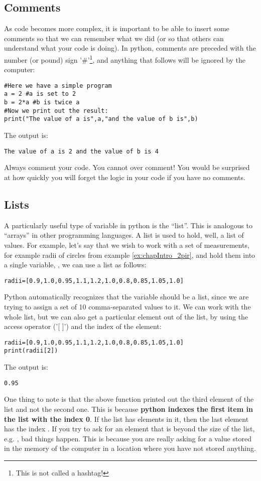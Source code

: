\subsection{Comments}
As code becomes more complex, it is important to be able to insert some comments so that we can remember what we did (or so that others can understand what your code is doing). In python, comments are preceded with the number (or pound) sign '\#'\footnote{This is not called a hashtag!}, and anything that follows will be ignored by the computer:
\begin{lstlisting}[frame=single]
#Here we have a simple program 
a = 2 #a is set to 2
b = 2*a #b is twice a
#Now we print out the result:
print("The value of a is",a,"and the value of b is",b)
\end{lstlisting}
The output is:
\begin{verbatim}
The value of a is 2 and the value of b is 4
\end{verbatim}
Always comment your code. You cannot over comment! You would be surprised at how quickly you will forget the logic in your code if you have no comments.
\subsection{Lists}
A particularly useful type of variable in python is the ``list''. This is analogous to ``arrays'' in other programming languages. A list is used to hold, well, a list of values. For example, let's say that we wish to work with a set of measurements, for example radii of circles from example \ref{ex:chapIntro_2pir}, and hold them into a single variable, , we can use a list as follows:
\begin{lstlisting}[frame=single] 
radii=[0.9,1.0,0.95,1.1,1.2,1.0,0.8,0.85,1.05,1.0]
\end{lstlisting}
Python automatically recognizes that the variable  should be a list, since we are trying to assign a set of 10 comma-separated values to it. We can work with the whole list, but we can also get a particular element out of the list, by using the access operator ('{[ ]}') and the index of the element:
\begin{lstlisting}[frame=single] 
radii=[0.9,1.0,0.95,1.1,1.2,1.0,0.8,0.85,1.05,1.0]
print(radii[2])
\end{lstlisting}
The output is:
\begin{verbatim}
0.95
\end{verbatim}
One thing to note is that the above  function printed out the third element of the list and not the second one. This is because \textbf{python indexes the first item in the list with the index 0}. If the list has  elements in it, then the last element has the index . If you try to ask for an element that is beyond the size of the list, e.g. , bad things happen. This is because you are really asking for a value stored in the memory of the computer in a location where you have not stored anything. 

